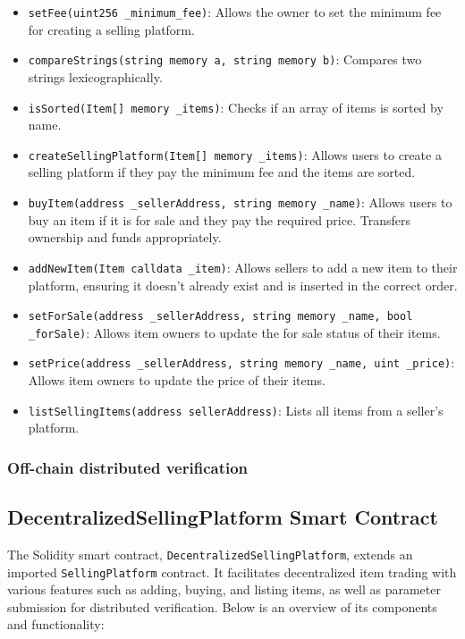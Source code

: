 \documentclass[runningheads]{llncs}
\begin{document}
\begin{itemize}
 \item \texttt{setFee(uint256 \_minimum\_fee)}: Allows the owner to set the minimum fee for creating a selling platform.

 \item \texttt{compareStrings(string memory a, string memory b)}:
Compares two strings lexicographically.

 \item  \texttt{isSorted(Item[] memory \_items)}:
Checks if an array of items is sorted by name.

 \item \texttt{createSellingPlatform(Item[] memory \_items)}:
Allows users to create a selling platform if they pay the minimum fee and the items are sorted.

 \item \texttt{buyItem(address \_sellerAddress, string memory \_name)}:
Allows users to buy an item if it is for sale and they pay the required price. Transfers ownership and funds appropriately.

 \item \texttt{addNewItem(Item calldata \_item)}:
Allows sellers to add a new item to their platform, ensuring it doesn't already exist and is inserted in the correct order.

 \item \texttt{setForSale(address \_sellerAddress, string memory \_name, bool \_forSale)}:
Allows item owners to update the for sale status of their items.
 \item \texttt{setPrice(address \_sellerAddress, string memory \_name, uint \_price)}:
Allows item owners to update the price of their items.
\item \texttt{listSellingItems(address sellerAddress)}:
Lists all items from a seller's platform.
\end{itemize}



\subsubsection{Off-chain distributed verification}
\subsection{DecentralizedSellingPlatform Smart Contract}

The Solidity smart contract, \texttt{DecentralizedSellingPlatform}, extends an imported \texttt{SellingPlatform} contract. It facilitates decentralized item trading with various features such as adding, buying, and listing items, as well as parameter submission for distributed verification. Below is an overview of its components and functionality:
\end{document}
